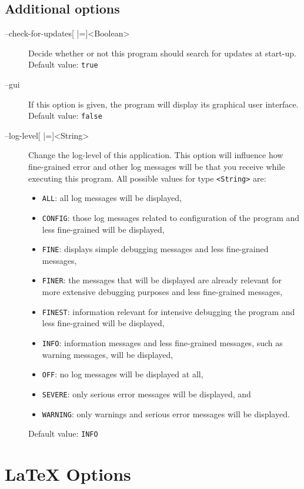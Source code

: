 \subsection{Additional options}
\begin{description}
\item[--check-for-updates{[} |={]}<Boolean>]
  Decide whether or not this program should search for updates
  at start-up.
  Default value: \texttt{true}

\item[--gui] If this option is given, the program will display its graphical
  user interface.
  Default value: \texttt{false}

\item[--log-level{[} |={]}<String>]
  Change the log-level of this application. This option will influence how
  fine-grained error and other log messages will be that you receive while
  executing this program.
  All possible values for type \texttt{<String>} are:
  \begin{itemize}
  \item \texttt{ALL}: all log messages will be displayed,
  \item \texttt{CONFIG}: those log messages related to configuration of the program and less fine-grained will be displayed,
  \item \texttt{FINE}:  displays simple debugging messages and less fine-grained messages,
  \item \texttt{FINER}: the messages that will be displayed are already relevant for more extensive debugging purposes and less fine-grained messages,
  \item \texttt{FINEST}: information relevant for intensive debugging the program and less fine-grained will be displayed,
  \item \texttt{INFO}: information messages and less fine-grained messages, such as warning messages, will be displayed,
  \item \texttt{OFF}: no log messages will be displayed at all,
  \item \texttt{SEVERE}: only serious error messages will be displayed, and
  \item \texttt{WARNING}: only warnings and serious error messages will be displayed.
  \end{itemize}
  Default value: \texttt{INFO}
\end{description}

\section{LaTeX Options}
\label{sec:LaTeX_Options}


